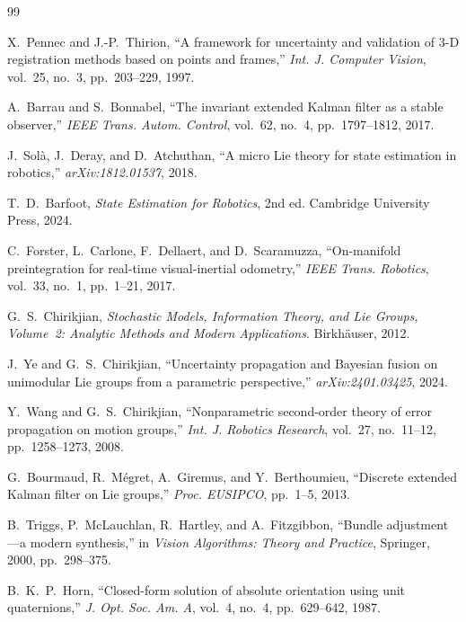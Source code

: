 \documentclass[journal]{IEEEtran}
\begin{document}
\begin{thebibliography}{99}
 
X.~Pennec and J.-P.~Thirion,
``A framework for uncertainty and validation of 3-D registration 
methods based on points and frames,''
\emph{Int. J. Computer Vision}, vol.~25, no.~3, pp.~203--229, 1997.
 
A.~Barrau and S.~Bonnabel,
``The invariant extended Kalman filter as a stable observer,''
\emph{IEEE Trans. Autom. Control}, vol.~62, no.~4, pp.~1797--1812, 2017.
 
J.~Sol\`{a}, J.~Deray, and D.~Atchuthan,
``A micro Lie theory for state estimation in robotics,''
\emph{arXiv:1812.01537}, 2018.
 
T.~D.~Barfoot,
\emph{State Estimation for Robotics}, 2nd ed.
Cambridge University Press, 2024.
 
C.~Forster, L.~Carlone, F.~Dellaert, and D.~Scaramuzza,
``On-manifold preintegration for real-time visual-inertial odometry,''
\emph{IEEE Trans. Robotics}, vol.~33, no.~1, pp.~1--21, 2017.
 
G.~S.~Chirikjian,
\emph{Stochastic Models, Information Theory, and Lie Groups, 
Volume~2: Analytic Methods and Modern Applications}.
Birkh\"{a}user, 2012.
 
J.~Ye and G.~S.~Chirikjian,
``Uncertainty propagation and Bayesian fusion on unimodular 
Lie groups from a parametric perspective,''
\emph{arXiv:2401.03425}, 2024.
 
Y.~Wang and G.~S.~Chirikjian,
``Nonparametric second-order theory of error propagation 
on motion groups,''
\emph{Int. J. Robotics Research}, vol.~27, no.~11--12, 
pp.~1258--1273, 2008.
 
G.~Bourmaud, R.~M\'{e}gret, A.~Giremus, and Y.~Berthoumieu,
``Discrete extended Kalman filter on Lie groups,''
\emph{Proc. EUSIPCO}, pp.~1--5, 2013.
 
B.~Triggs, P.~McLauchlan, R.~Hartley, and A.~Fitzgibbon,
``Bundle adjustment---a modern synthesis,''
in \emph{Vision Algorithms: Theory and Practice}, 
Springer, 2000, pp.~298--375.
 
B.~K.~P.~Horn,
``Closed-form solution of absolute orientation using unit 
quaternions,''
\emph{J. Opt. Soc. Am. A}, vol.~4, no.~4, pp.~629--642, 1987.
 

\end{thebibliography}
\end{document}
